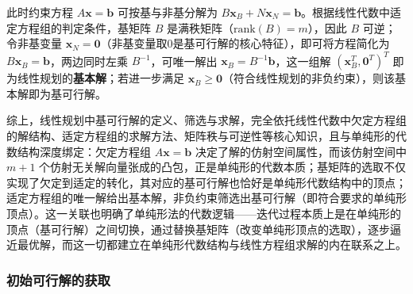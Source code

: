 \documentclass[12pt]{article}
\theoremstyle{plain}
\theoremstyle{definition}
\newcommand{\rank}{\mathrm{rank}}
\begin{document}
此时约束方程 $A \bm{x} = \bm{b}$ 可按基与非基分解为 $B\bm{x}_B + N\bm{x}_N = \bm{b}$。根据线性代数中适定方程组的判定条件，基矩阵 $B$ 是满秩矩阵（$\rank(B) = m$），因此 $B$ 可逆；令非基变量 $\bm{x}_N = \bm{0}$（非基变量取0是基可行解的核心特征），即可将方程简化为 $B\bm{x}_B = \bm{b}$，两边同时左乘 $B^{-1}$，可唯一解出 $\bm{x}_B = B^{-1}\bm{b}$，这一组解 $(\bm{x}_B^T, \bm{0}^T)^T$ 即为线性规划的\textbf{基本解}；若进一步满足 $\bm{x}_B \geq \bm{0}$（符合线性规划的非负约束），则该基本解即为基可行解。

综上，线性规划中基可行解的定义、筛选与求解，完全依托线性代数中欠定方程组的解结构、适定方程组的求解方法、矩阵秩与可逆性等核心知识，且与单纯形的代数结构深度绑定：欠定方程组 $A \bm{x} = \bm{b}$ 决定了解的仿射空间属性，而该仿射空间中 $m+1$ 个仿射无关解向量张成的凸包，正是单纯形的代数本质；基矩阵的选取不仅实现了欠定到适定的转化，其对应的基可行解也恰好是单纯形代数结构中的顶点；适定方程组的唯一解给出基本解，非负约束筛选出基可行解（即符合要求的单纯形顶点）。这一关联也明确了单纯形法的代数逻辑——迭代过程本质上是在单纯形的顶点（基可行解）之间切换，通过替换基矩阵（改变单纯形顶点的选取），逐步逼近最优解，而这一切都建立在单纯形代数结构与线性方程组求解的内在联系之上。

\subsubsection{初始可行解的获取}\label{subsubsec:initial_solution}
\end{document}
